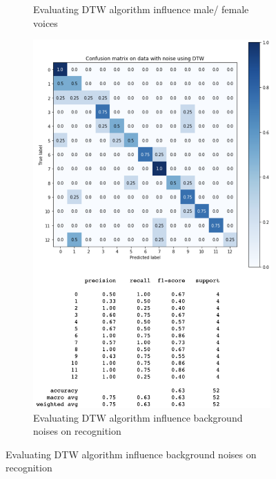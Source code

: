 \documentclass[%
  article,%
  10pt,%
  a4paper,%
  fleqn,%
  oneside,%
  sumario = tradicional,%
  chapter = TITLE,%
  section = TITLE,%
]{abntex2}
\begin{document}
\begin{figure}
\begin{minipage}[b]{.4\textwidth}
\begin{figure}[H]
  \caption{Evaluating DTW algorithm influence male/ female voices}
  \label{fig:dtwmalevsfemale}
\end{figure}
\end{minipage}\qquad
\begin{minipage}[b]{.4\textwidth}
\begin{figure}[H]
  \centering
  \includegraphics[width = \columnwidth]{./Figuras/dtwnoise}
   \caption{Evaluating DTW algorithm influence background noises on recognition}
   \label{fig:dtwnoiseonly}
\end{figure}
\end{minipage}
\end{figure}
\end{document}
